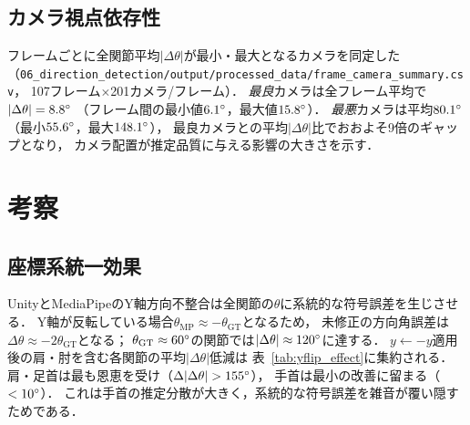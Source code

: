\documentclass[twocolumn]{article}
\begin{document}
\subsection{カメラ視点依存性}
\label{subsec:camera_dep}

フレームごとに全関節平均$|\Delta\theta|$が最小・最大となるカメラを同定した
（\texttt{06\_direction\_detection/output/processed\_data/frame\_camera\_summary.csv}，
107フレーム$\times$201カメラ/フレーム）．
\emph{最良}カメラは全フレーム平均で$|\Delta\theta|=8.8\degree{}$
（フレーム間の最小値$6.1\degree{}$，最大値$15.8\degree{}$）．
\emph{最悪}カメラは平均$80.1\degree{}$（最小$55.6\degree{}$，最大$148.1\degree{}$），
最良カメラとの平均$|\Delta\theta|$比でおおよそ9倍のギャップとなり，
カメラ配置が推定品質に与える影響の大きさを示す．

\section{考察}

\subsection{座標系統一効果}

UnityとMediaPipeのY軸方向不整合は全関節の$\theta$に系統的な符号誤差を生じさせる．
Y軸が反転している場合$\theta_{\text{MP}} \approx -\theta_{\text{GT}}$となるため，
未修正の方向角誤差は$\Delta\theta \approx -2\theta_{\text{GT}}$となる；
$\theta_{\text{GT}} \approx 60\degree{}$の関節では$|\Delta\theta| \approx 120\degree{}$に達する．
$y \leftarrow -y$適用後の肩・肘を含む各関節の平均$|\Delta\theta|$低減は
表~\ref{tab:yflip_effect}に集約される\cite{mediapipe_coord_issue}．
肩・足首は最も恩恵を受け（$\Delta|\Delta\theta|>155\degree{}$），
手首は最小の改善に留まる（$<10\degree{}$）．
これは手首の推定分散が大きく，系統的な符号誤差を雑音が覆い隠すためである．
\end{document}

